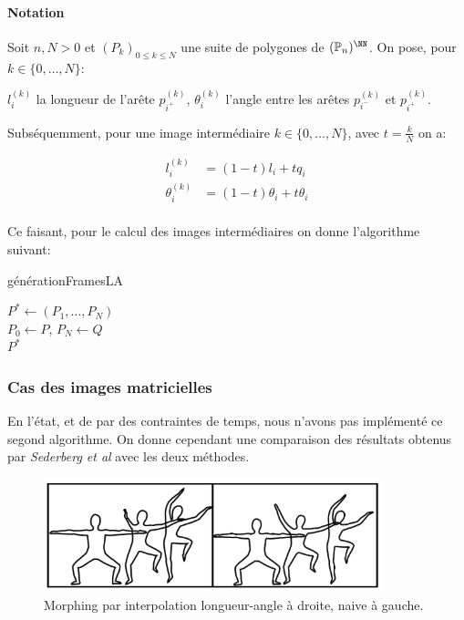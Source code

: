 \paragraph*{Notation} Soit $n,N>0$ et $(P_k)_{0\leq k\leq N}$ une suite de polygones de $(\mathbb{P}_{n})^{\NN}$.
On pose, pour $k\in\{0,\ldots,N\}$:
\begin{itemize}
    \flch $l^{(k)}_i$ la longueur de l'arête $p^{(k)}_{i^{+}}$,
    \flch $\theta^{(k)}_i$ l'angle entre les arêtes $p^{(k)}_{i^{-}}$ et $p^{(k)}_{i^{+}}$.
\end{itemize}
Subséquemment, pour une image intermédiaire $k \in \{0,\ldots,N\}$, avec $t=\frac{k}{N}$ on a:

\begin{align*}
        l^{(k)}_i &= (1-t)l_i+tq_i\\
        \theta^{(k)}_i &= (1-t)\theta_i+t\theta_i
\end{align*}

\paragraph{} Ce faisant, pour le calcul des images intermédiaires on donne l'algorithme suivant:

\begin{algorithm}[H]
    \caption{générationFramesLA}\label{alg:1}
    \SetAlgoLined
    $P^*\gets(P_1,\dots,P_N)$\\
    $P_0\gets P$, $P_N\gets Q$\\
    \Return $P^*$
\end{algorithm}

\subsubsection{Cas des images matricielles}
\begin{codeb}
    En l'état, et de par des contraintes de temps, nous n'avons pas implémenté ce segond algorithme. On donne cependant une comparaison des résultats obtenus par \emph{Sederberg et al} \cite{sederberg1993} avec les deux méthodes.
\end{codeb}

\begin{figure}[h!]
    \centering
    \includegraphics{img/p1/la.png}
    \caption{Morphing par interpolation longueur-angle à droite, naive à gauche. \cite{sederberg1993}}
\end{figure}